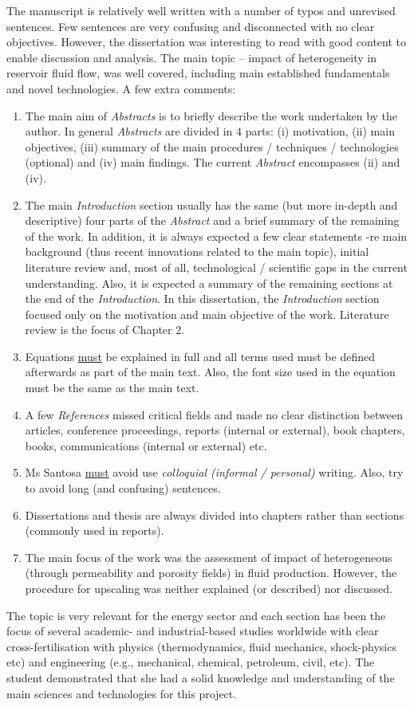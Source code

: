 \documentclass[14pt,twoside]{report}
\begin{document}
The manuscript is relatively well written with a number of typos and unrevised sentences. Few sentences are very confusing and disconnected with no clear objectives. However, the dissertation was interesting to read with good content to enable discussion and analysis. The main topic -- impact of heterogeneity in reservoir fluid flow, was well covered, including main established fundamentals and novel technologies. A few extra comments:
\begin{enumerate}
\item The main aim of {\it Abstracts} is to briefly describe the work undertaken by the author. In general {\it Abstracts} are divided in 4 parts: (i) motivation, (ii) main objectives, (iii) summary of the main procedures / techniques / technologies (optional) and (iv) main findings. The current {\it Abstract} encompasses (ii) and (iv).
%
\item The main {\it Introduction} section usually has the same (but more in-depth and descriptive) four parts of the {\it Abstract} and a brief summary of the remaining of the work. In addition, it is always expected a few clear statements -re main background (thus recent innovations related to the main topic), initial literature review and, most of all, technological / scientific gaps in the current understanding. Also, it is expected a summary of the remaining sections at the end of the {\it Introduction}. In this dissertation, the {\it Introduction} section focused only on the motivation and main objective of the work. Literature review is the focus of Chapter 2. 
%
\item Equations \underline{must} be explained in full and all terms used must be defined afterwards as part of the main text. Also, the font size used in the equation must be the same as the main text.  
%
\item A few {\it References} missed critical fields and made no clear distinction between articles, conference proceedings, reports (internal or external), book chapters, books, communications (internal or external) etc.  
%
\item Ms Santosa \underline{must} avoid use {\it colloquial (informal / personal)} writing. Also, try to avoid long (and confusing) sentences.  
%
\item Dissertations and thesis are always divided into chapters rather than sections (commonly used in reports).
%
\item The main focus of the work was the assessment of impact of heterogeneous (through permeability and porosity fields) in fluid production. However, the procedure for upscaling was neither explained (or described) nor discussed.     
% 
\end{enumerate}
The topic is very relevant for the energy sector and each section has been the focus of several academic- and industrial-based studies worldwide with clear cross-fertilisation with physics (thermodynamics, fluid mechanics, shock-physics etc) and engineering (e.g., mechanical, chemical, petroleum, civil, etc). The student demonstrated that she had a solid knowledge and understanding of the main sciences and technologies for this project.
\end{document}
